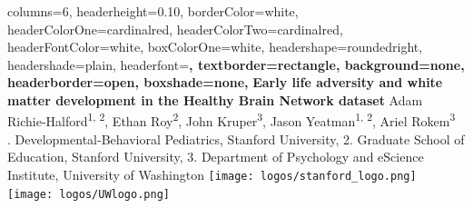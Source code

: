 \documentclass[a0paper,landscape,fontscale=0.385]{baposter}
\begin{document}
\begin{poster}{
    columns=6,
    headerheight=0.10\textheight,
    borderColor=white, %
    headerColorOne=cardinalred, %
    headerColorTwo=cardinalred, %
    headerFontColor=white, %
    boxColorOne=white, %
    headershape=roundedright, %
    headershade=plain, %
    headerfont=\Large\sf\bf, %
    textborder=rectangle,
    background=none,
    headerborder=open, %
    boxshade=none,
}
{}
%
%
{\sf\bf %
Early life adversity and white matter development %
in the Healthy Brain Network dataset
\hfill %
\null %
} %
{%
    \vspace{0.4em}
    Adam Richie-Halford\textsuperscript{1, 2}, %
    Ethan Roy\textsuperscript{2}, %
    John Kruper\textsuperscript{3}, %
    Jason Yeatman\textsuperscript{1, 2}, %
    Ariel Rokem\textsuperscript{3} \hfill \null \\
    {. Developmental-Behavioral Pediatrics, Stanford University, %
        2. Graduate School of Education, Stanford University, %
        3. Department of Psychology and eScience Institute, University of Washington %
        \hfill \null
    }
} %
{%
\texttt{[image: logos/stanford\_logo.png]}%
\hspace{0.25em}
\texttt{[image: logos/UWlogo.png]}%
} %


\end{poster}
\end{document}
